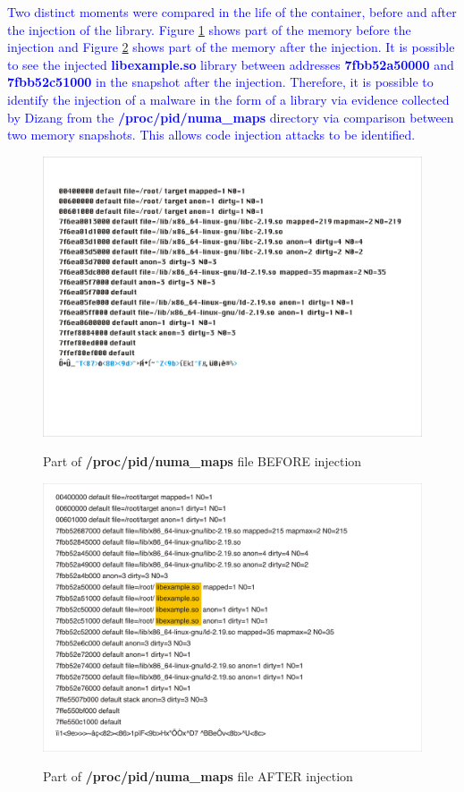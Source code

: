 \documentclass[conference]{IEEEtran}
\newcommand{\fancyname}{Dizang }
\begin{document}
\textcolor{blue}{Two distinct moments were compared in the life of the container, before and after the injection of the library.
%
Figure \ref{fig:antes-injecao} shows part of the memory before the injection and Figure \ref{fig:apos-injecao} shows part of the memory after the injection.
%
It is possible to see the injected \textbf{libexample.so} library between addresses \textbf{7fbb52a50000} and \textbf{7fbb52c51000} in the snapshot after the injection.
%
Therefore, it is possible to identify the injection of a malware in the form of a library via evidence collected by \fancyname from the \textbf{/proc/pid/numa\_maps} directory via comparison between two memory snapshots.
%
This allows code injection attacks to be identified.}

\begin{figure}[htb!]
\footnotesize
\caption{Part of \textbf{/proc/pid/numa\_maps} file BEFORE injection }
\includegraphics[scale=0.31]{antes-injecao.jpg}
\centering
\label{fig:antes-injecao}
\end{figure}


\begin{figure}[htb!]
\footnotesize
\caption{Part of \textbf{/proc/pid/numa\_maps} file AFTER injection }
\includegraphics[scale=0.21]{apos-injecao.jpg}
\centering
\label{fig:apos-injecao}
\end{figure}
\end{document}

